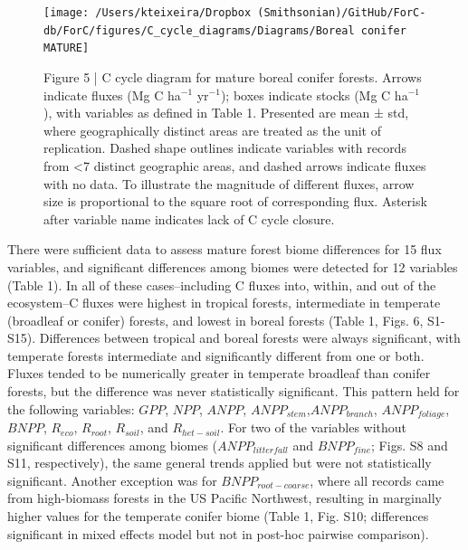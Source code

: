 \documentclass[
]{article}
\begin{document}
\begin{landscape}
\begin{figure}[H]

{\centering \texttt{[image: /Users/kteixeira/Dropbox (Smithsonian)/GitHub/ForC-db/ForC/figures/C\_cycle\_diagrams/Diagrams/Boreal conifer MATURE]} 

}

\caption{Figure 5 | C cycle diagram for mature boreal conifer forests. Arrows indicate fluxes (Mg C ha$^{-1}$ yr$^{-1}$); boxes indicate stocks (Mg C ha$^{-1}$), with variables as defined in Table 1. Presented are mean ± std, where geographically distinct areas are treated as the unit of replication. Dashed shape outlines indicate variables with records from <7 distinct geographic areas, and dashed arrows indicate fluxes with no data. To illustrate the magnitude of different fluxes, arrow size is proportional to the square root of corresponding flux. Asterisk after variable name indicates lack of C cycle closure.}\label{fig:unnamed-chunk-12}
\end{figure}
\end{landscape}

There were sufficient data to assess mature forest biome differences for
15 flux variables, and significant differences among biomes were
detected for 12 variables (Table 1). In all of these cases--including C
fluxes into, within, and out of the ecosystem--C fluxes were highest in
tropical forests, intermediate in temperate (broadleaf or conifer)
forests, and lowest in boreal forests (Table 1, Figs. 6, S1-S15).
Differences between tropical and boreal forests were always significant,
with temperate forests intermediate and significantly different from one
or both. Fluxes tended to be numerically greater in temperate broadleaf
than conifer forests, but the difference was never statistically
significant. This pattern held for the following variables: \(GPP\),
\(NPP\), \(ANPP\), \(ANPP_{stem}\),\(ANPP_{branch}\),
\(ANPP_{foliage}\), \(BNPP\), \(R_{eco}\), \(R_{root}\), \(R_{soil}\),
and \(R_{het-soil}\). For two of the variables without significant
differences among biomes (\(ANPP_{litterfall}\) and \(BNPP_{fine}\);
Figs. S8 and S11, respectively), the same general trends applied but
were not statistically significant. Another exception was for
\(BNPP_{root-coarse}\), where all records came from high-biomass forests
in the US Pacific Northwest, resulting in marginally higher values for
the temperate conifer biome (Table 1, Fig. S10; differences significant
in mixed effects model but not in post-hoc pairwise comparison).
\end{document}
